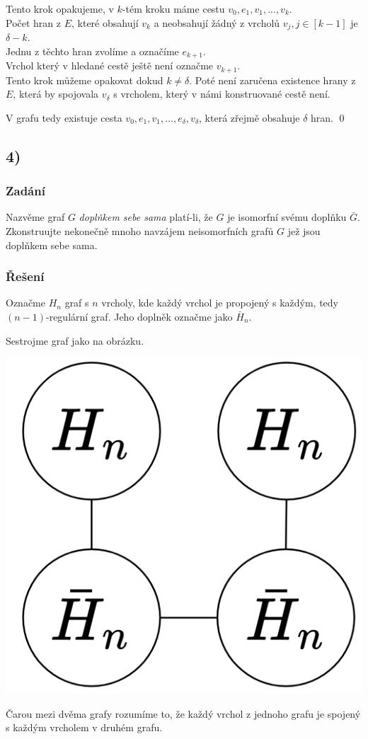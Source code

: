 \documentclass[../main.tex]{subfiles}
\begin{document}
Tento krok opakujeme, v $k$-tém kroku máme cestu $v_0, e_1, v_1, ..., v_k$. \\
Počet hran z $E$, které obsahují $v_k$ a neobsahují žádný z vrcholů $v_j, j\in[k-1]$ je $\delta-k$.\\
Jednu z těchto hran zvolíme a označíme $e_{k+1}$.\\
Vrchol který v hledané cestě ještě není označme $v_{k+1}$.\\


Tento krok můžeme opakovat dokud $k \neq \delta$. Poté není zaručena existence hrany z $E$, 
která by spojovala $v_\delta$ s vrcholem, který v námi konstruované cestě není.

V grafu tedy existuje cesta $v_0, e_1, v_1, ...,e_\delta , v_\delta$, která zřejmě obsahuje $\delta$ hran.
\qed


\subsection*{4)}
\subsubsection*{Zadání}
Nazvěme graf $G$ \textit{doplňkem sebe sama} platí-li, že $G$ je isomorfní svému doplňku $\bar{G}$. 
Zkonstruujte nekonečně mnoho navzájem neisomorfních grafů $G$ jež jsou doplňkem sebe sama.
\subsubsection*{Řešení}

Označme $H_n$ graf s $n$ vrcholy, kde každý vrchol je propojený s každým, tedy $(n-1)$-regulární graf. 
Jeho doplněk označme jako $\bar{H}_n$.

Sestrojme graf jako na obrázku.

\begin{center}
    \centering
    \includegraphics*[width=0.3\linewidth]{images/hw1-4a.png}
\end{center}

Čarou mezi dvěma grafy rozumíme to, že každý vrchol z jednoho grafu je spojený s každým vrcholem v druhém grafu. 
\end{document}
